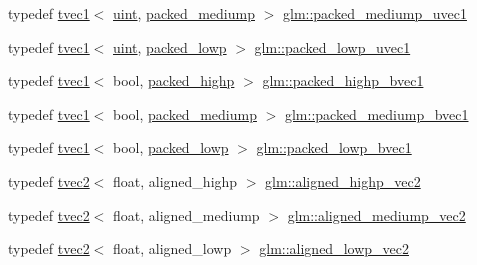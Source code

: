 \begin{DoxyCompactItemize}
\item 
typedef \mbox{\hyperlink{structglm_1_1tvec1}{tvec1}}$<$ \mbox{\hyperlink{group__core__precision_ga4fd29415871152bfb5abd588334147c8}{uint}}, \mbox{\hyperlink{namespaceglm_a0f04f086094c747d227af4425893f545a9604654c3b137cd7898689fd34b25bc0}{packed\+\_\+mediump}} $>$ \mbox{\hyperlink{group__gtc__type__aligned_gabde8aa40669369c3caeb44a88f323c94}{glm\+::packed\+\_\+mediump\+\_\+uvec1}}
\item 
typedef \mbox{\hyperlink{structglm_1_1tvec1}{tvec1}}$<$ \mbox{\hyperlink{group__core__precision_ga4fd29415871152bfb5abd588334147c8}{uint}}, \mbox{\hyperlink{namespaceglm_a0f04f086094c747d227af4425893f545ac36a4bd74559be2c0b65bc48e5953b8b}{packed\+\_\+lowp}} $>$ \mbox{\hyperlink{group__gtc__type__aligned_gac7075bf9986d0fda492553dcc8dba144}{glm\+::packed\+\_\+lowp\+\_\+uvec1}}
\item 
typedef \mbox{\hyperlink{structglm_1_1tvec1}{tvec1}}$<$ bool, \mbox{\hyperlink{namespaceglm_a0f04f086094c747d227af4425893f545a8e8791ee77fe079b1291f710d88031bf}{packed\+\_\+highp}} $>$ \mbox{\hyperlink{group__gtc__type__aligned_ga377e3268d132071ff041d9a1c960b2db}{glm\+::packed\+\_\+highp\+\_\+bvec1}}
\item 
typedef \mbox{\hyperlink{structglm_1_1tvec1}{tvec1}}$<$ bool, \mbox{\hyperlink{namespaceglm_a0f04f086094c747d227af4425893f545a9604654c3b137cd7898689fd34b25bc0}{packed\+\_\+mediump}} $>$ \mbox{\hyperlink{group__gtc__type__aligned_ga556942046cd364d388d949bddd4c8111}{glm\+::packed\+\_\+mediump\+\_\+bvec1}}
\item 
typedef \mbox{\hyperlink{structglm_1_1tvec1}{tvec1}}$<$ bool, \mbox{\hyperlink{namespaceglm_a0f04f086094c747d227af4425893f545ac36a4bd74559be2c0b65bc48e5953b8b}{packed\+\_\+lowp}} $>$ \mbox{\hyperlink{group__gtc__type__aligned_ga4b803db802aa82cc46d17120e786de1d}{glm\+::packed\+\_\+lowp\+\_\+bvec1}}
\item 
typedef \mbox{\hyperlink{structglm_1_1tvec2}{tvec2}}$<$ float, aligned\+\_\+highp $>$ \mbox{\hyperlink{group__gtc__type__aligned_ga5873b18cca2602c92bb077e663e29bbd}{glm\+::aligned\+\_\+highp\+\_\+vec2}}
\item 
typedef \mbox{\hyperlink{structglm_1_1tvec2}{tvec2}}$<$ float, aligned\+\_\+mediump $>$ \mbox{\hyperlink{group__gtc__type__aligned_ga4bbaec6ecf4e72dfdb2ad83b3b8c49b8}{glm\+::aligned\+\_\+mediump\+\_\+vec2}}
\item 
typedef \mbox{\hyperlink{structglm_1_1tvec2}{tvec2}}$<$ float, aligned\+\_\+lowp $>$ \mbox{\hyperlink{group__gtc__type__aligned_gab09a9786d58f065dafde28b725cc5370}{glm\+::aligned\+\_\+lowp\+\_\+vec2}}

\end{DoxyCompactItemize}
